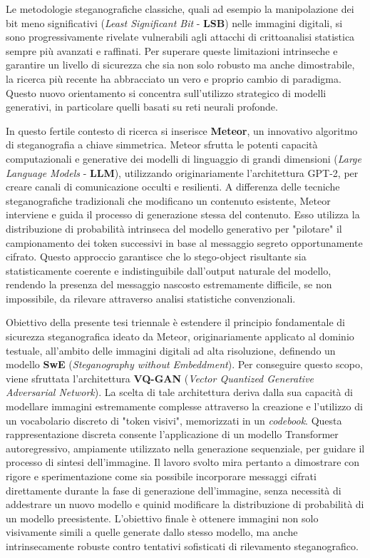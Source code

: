 Le metodologie steganografiche classiche, quali ad esempio la manipolazione dei bit meno significativi (\emph{Least Significant Bit} - \textbf{LSB}) nelle immagini digitali, si sono progressivamente rivelate vulnerabili agli attacchi di crittoanalisi statistica sempre più avanzati e raffinati. Per superare queste limitazioni intrinseche e garantire un livello di sicurezza che sia non solo robusto ma anche dimostrabile, la ricerca più recente ha abbracciato un vero e proprio cambio di paradigma. Questo nuovo orientamento si concentra sull'utilizzo strategico di modelli generativi, in particolare quelli basati su reti neurali profonde.

In questo fertile contesto di ricerca si inserisce \textbf{Meteor}, un innovativo algoritmo di steganografia a chiave simmetrica. Meteor sfrutta le potenti capacità computazionali e generative dei modelli di linguaggio di grandi dimensioni (\emph{Large Language Models} - \textbf{LLM}), utilizzando originariamente l'architettura GPT-2, per creare canali di comunicazione occulti e resilienti. A differenza delle tecniche steganografiche tradizionali che modificano un contenuto esistente, Meteor interviene e guida il processo di generazione stessa del contenuto. Esso utilizza la distribuzione di probabilità intrinseca del modello generativo per "pilotare" il campionamento dei token successivi in base al messaggio segreto opportunamente cifrato. Questo approccio garantisce che lo stego-object risultante sia statisticamente coerente e indistinguibile dall'output naturale del modello, rendendo la presenza del messaggio nascosto estremamente difficile, se non impossibile, da rilevare attraverso analisi statistiche convenzionali.

Obiettivo della presente tesi triennale è estendere il principio fondamentale di sicurezza steganografica ideato da Meteor, originariamente applicato al dominio testuale, all'ambito delle immagini digitali ad alta risoluzione, definendo un modello \textbf{SwE} (\emph{Steganography without Embeddment}).
Per conseguire questo scopo, viene sfruttata l'architettura \textbf{VQ-GAN} (\emph{Vector Quantized Generative Adversarial Network}). La scelta di tale architettura deriva dalla sua capacità di modellare immagini estremamente complesse attraverso la creazione e l'utilizzo di un vocabolario discreto di "token visivi", memorizzati in un \emph{codebook}. Questa rappresentazione discreta consente l'applicazione di un modello Transformer autoregressivo, ampiamente utilizzato nella generazione sequenziale, per guidare il processo di sintesi dell'immagine.
Il lavoro svolto mira pertanto a dimostrare con rigore e sperimentazione come sia possibile incorporare messaggi cifrati direttamente durante la fase di generazione dell'immagine, senza necessità di addestrare un nuovo modello e quinid modificare la distribuzione di probabilità di un modello preesistente. L'obiettivo finale è ottenere immagini non solo visivamente simili a quelle generate dallo stesso modello, ma anche intrinsecamente robuste contro tentativi sofisticati di rilevamento steganografico.

